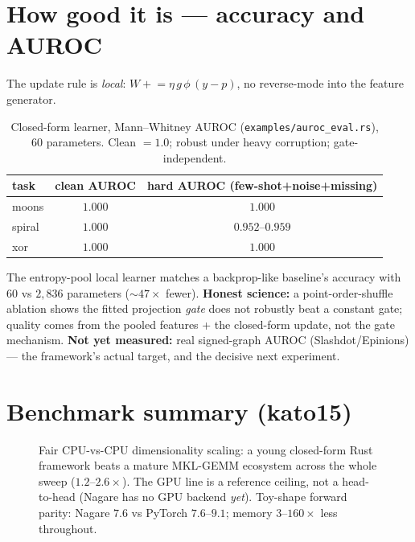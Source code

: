 \documentclass[11pt]{article}
\begin{document}
\section{How good it is --- accuracy and AUROC}
The update rule is \emph{local}: $W \mathrel{+}= \eta\,g\,\phi\,(y-p)$, no
reverse-mode into the feature generator.

\begin{table}[h]\centering\small
\begin{tabular}{lcc}
\toprule
task & clean AUROC & hard AUROC (few-shot+noise+missing)\\
\midrule
moons  & $1.000$ & $1.000$\\
spiral & $1.000$ & $0.952$--$0.959$\\
xor    & $1.000$ & $1.000$\\
\bottomrule
\end{tabular}
\caption{Closed-form learner, Mann--Whitney AUROC (\texttt{examples/auroc\_eval.rs}),
$60$ parameters. Clean $=1.0$; robust under heavy corruption; gate-independent.}
\end{table}

The entropy-pool local learner matches a backprop-like baseline's accuracy with
$60$ vs $2{,}836$ parameters ($\sim47\times$ fewer). \textbf{Honest science:} a
point-order-shuffle ablation shows the fitted projection \emph{gate} does not
robustly beat a constant gate; quality comes from the pooled features + the
closed-form update, not the gate mechanism. \textbf{Not yet measured:}
real signed-graph AUROC (Slashdot/Epinions) --- the framework's actual target,
and the decisive next experiment.

\section{Benchmark summary (kato15)}\label{sec:bench}
\begin{figure}[h]\centering
{}
\caption{Fair CPU-vs-CPU dimensionality scaling: a young closed-form Rust
framework beats a mature MKL-GEMM ecosystem across the whole sweep ($1.2$--$2.6\times$).
The GPU line is a reference ceiling, not a head-to-head (Nagare has no GPU backend
\emph{yet}). Toy-shape forward parity: Nagare $7.6$ vs PyTorch $7.6$--$9.1$; memory
$3$--$160\times$ less throughout.}
\end{figure}
\end{document}
